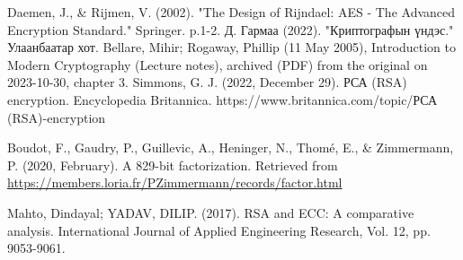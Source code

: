 
\singlespace
{}
\begin{thebibliography}{}
	Daemen, J., \& Rijmen, V. (2002). "The Design of Rijndael: AES - The Advanced Encryption Standard." Springer. p.1-2.
	Д. Гармаа (2022). "Криптографын үндэс." Улаанбаатар хот.
	Bellare, Mihir; Rogaway, Phillip (11 May 2005), Introduction to Modern Cryptography (Lecture notes), archived (PDF) from the original on 2023-10-30, chapter 3.
	Simmons, G. J. (2022, December 29). РСА (RSA) encryption. Encyclopedia Britannica. https://www.britannica.com/topic/РСА (RSA)-encryption

Boudot, F., Gaudry, P., Guillevic, A., Heninger, N., Thomé, E., \& Zimmermann, P. (2020, February). A 829-bit factorization. Retrieved from \url{https://members.loria.fr/PZimmermann/records/factor.html}

Mahto, Dindayal; YADAV, DILIP. (2017). RSA and ECC: A comparative analysis. International Journal of Applied Engineering Research, Vol. 12, pp. 9053-9061.

\end{thebibliography}